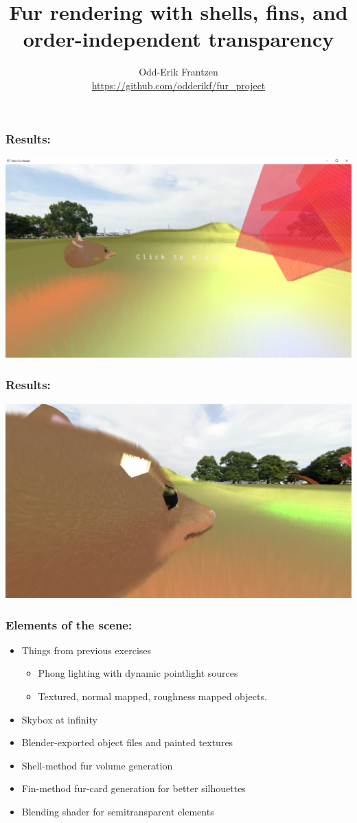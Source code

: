 \documentclass[12pt]{beamer}
\title{Fur rendering with shells, fins, and order-independent transparency}
\author{Odd-Erik Frantzen\\ \url{https://github.com/odderikf/fur_project} }
\begin{document}
    \maketitle
    \begin{frame}
        \frametitle{Results:}
        \includegraphics[width=\textwidth]{fullscene}
    \end{frame}
    \begin{frame}
        \frametitle{Results:}
        \includegraphics[width=\textwidth]{both}
    \end{frame}
    \begin{frame}
        \frametitle{Elements of the scene:}

        \begin{itemize}
            \item Things from previous exercises
            \begin{itemize}
                \item Phong lighting with dynamic pointlight sources
                \item Textured, normal mapped, roughness mapped objects.
            \end{itemize}

            \item Skybox at infinity
            \item Blender-exported object files and painted textures
            \item Shell-method fur volume generation
            \item Fin-method fur-card generation for better silhouettes
            \item Blending shader for semitransparent elements
        \end{itemize}
    \end{frame}
\end{document}

